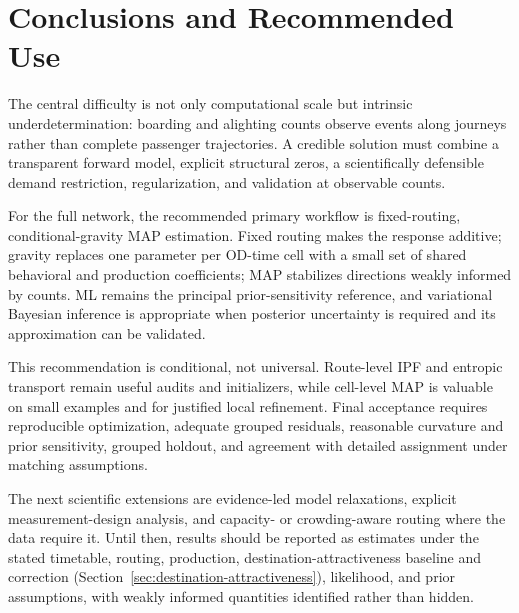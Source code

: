 


\section{Conclusions and Recommended Use}

The central difficulty is not only computational scale but intrinsic
underdetermination: boarding and alighting counts observe events along journeys
rather than complete passenger trajectories. A credible solution must combine
a transparent forward model, explicit structural zeros, a scientifically
defensible demand restriction, regularization, and validation at observable
counts.

For the full network, the recommended primary workflow is fixed-routing,
conditional-gravity MAP estimation. Fixed routing makes the response additive;
gravity replaces one parameter per OD-time cell with a small set of shared
behavioral and production coefficients; MAP stabilizes directions weakly
informed by counts. ML remains the principal prior-sensitivity reference, and
variational Bayesian inference is appropriate when posterior uncertainty is
required and its approximation can be validated.

This recommendation is conditional, not universal. Route-level IPF and
entropic transport remain useful audits and initializers, while cell-level MAP
is valuable on small examples and for justified local refinement. Final
acceptance requires reproducible optimization, adequate grouped residuals,
reasonable curvature and prior sensitivity, grouped holdout, and agreement
with detailed assignment under matching assumptions.

The next scientific extensions are evidence-led model relaxations, explicit
measurement-design analysis, and capacity- or crowding-aware routing where the
data require it. Until then, results should be reported as estimates under the
stated timetable, routing, production, destination-attractiveness baseline and
correction (Section~\ref{sec:destination-attractiveness}), likelihood, and prior
assumptions, with weakly informed quantities identified rather than hidden.

